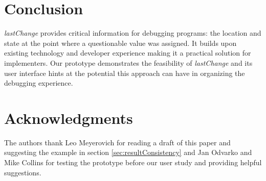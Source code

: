 \documentclass{sig-alternate}
\begin{document}
 


\section{Conclusion}
\textit{lastChange} provides critical information for debugging programs: the location and state at the point where a questionable value was assigned. It builds upon existing technology and developer experience making it a practical solution for implementers. Our prototype demonstrates the feasibility of \textit{lastChange} and its user interface hints at the potential this approach can have in organizing the debugging experience. 




\section{Acknowledgments}
The authors thank Leo Meyerovich for reading a draft of this paper and suggesting the example in section \ref{sec:resultConsistency} and
Jan Odvarko and Mike Collins for testing the prototype before our user study and providing helpful suggestions.
\end{document}
